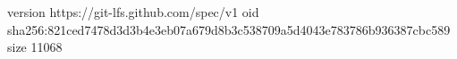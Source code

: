 version https://git-lfs.github.com/spec/v1
oid sha256:821ced7478d3d3b4e3eb07a679d8b3c538709a5d4043e783786b936387cbc589
size 11068
